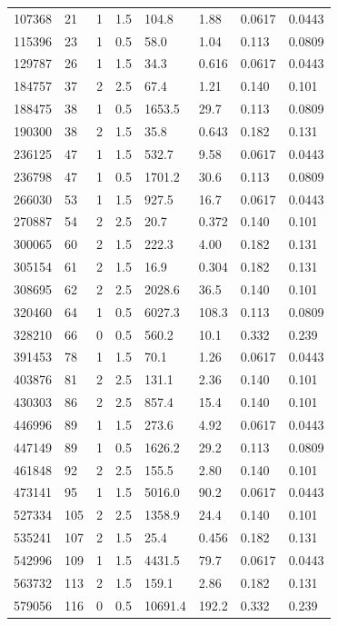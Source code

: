 \documentclass[preview]{standalone}
\begin{document}
{{\begin{tabular}{L{1.2cm}C{1.2cm} C{0.3cm}C{0.5cm} C{1.4cm}C{1.4cm} C{1.4cm}C{1.4cm}}
  107368  &    21  & 1     & 1.5 &  104.8  & 1.88  & 0.0617 &  0.0443   \\ 
  115396  &    23  & 1     & 0.5 &  58.0  & 1.04  & 0.113 &  0.0809   \\ 
  129787  &    26  & 1     & 1.5 &  34.3  & 0.616  & 0.0617 &  0.0443   \\ 
  184757  &    37  & 2     & 2.5 &  67.4  & 1.21  & 0.140 &  0.101   \\ 
  188475  &    38  & 1     & 0.5 &  1653.5  & 29.7  & 0.113 &  0.0809   \\ 
  190300  &    38  & 2     & 1.5 &  35.8  & 0.643  & 0.182 &  0.131   \\ 
  236125  &    47  & 1     & 1.5 &  532.7  & 9.58  & 0.0617 &  0.0443   \\ 
  236798  &    47  & 1     & 0.5 &  1701.2  & 30.6  & 0.113 &  0.0809   \\ 
  266030  &    53  & 1     & 1.5 &  927.5  & 16.7  & 0.0617 &  0.0443   \\ 
  270887  &    54  & 2     & 2.5 &  20.7  & 0.372  & 0.140 &  0.101   \\ 
  300065  &    60  & 2     & 1.5 &  222.3  & 4.00  & 0.182 &  0.131   \\ 
  305154  &    61  & 2     & 1.5 &  16.9  & 0.304  & 0.182 &  0.131   \\ 
  308695  &    62  & 2     & 2.5 &  2028.6  & 36.5  & 0.140 &  0.101   \\ 
  320460  &    64  & 1     & 0.5 &  6027.3  & 108.3  & 0.113 &  0.0809   \\ 
  328210  &    66  & 0     & 0.5 &  560.2  & 10.1  & 0.332 &  0.239   \\ 
  391453  &    78  & 1     & 1.5 &  70.1  & 1.26  & 0.0617 &  0.0443   \\ 
  403876  &    81  & 2     & 2.5 &  131.1  & 2.36  & 0.140 &  0.101   \\ 
  430303  &    86  & 2     & 2.5 &  857.4  & 15.4  & 0.140 &  0.101   \\ 
  446996  &    89  & 1     & 1.5 &  273.6  & 4.92  & 0.0617 &  0.0443   \\ 
  447149  &    89  & 1     & 0.5 &  1626.2  & 29.2  & 0.113 &  0.0809   \\ 
  461848  &    92  & 2     & 2.5 &  155.5  & 2.80  & 0.140 &  0.101   \\ 
  473141  &    95  & 1     & 1.5 &  5016.0  & 90.2  & 0.0617 &  0.0443   \\ 
  527334  &   105  & 2     & 2.5 &  1358.9  & 24.4  & 0.140 &  0.101   \\ 
  535241  &   107  & 2     & 1.5 &  25.4  & 0.456  & 0.182 &  0.131   \\ 
  542996  &   109  & 1     & 1.5 &  4431.5  & 79.7  & 0.0617 &  0.0443   \\ 
  563732  &   113  & 2     & 1.5 &  159.1  & 2.86  & 0.182 &  0.131   \\ 
  579056  &   116  & 0     & 0.5 &  10691.4  & 192.2  & 0.332 &  0.239   \\ 
\hline 
\end{tabular} 

}}
\end{document}
